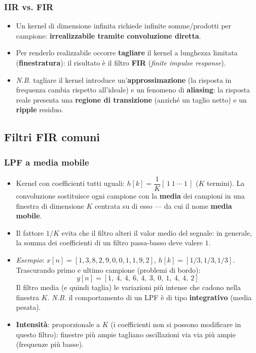 \documentclass[12pt, a4paper]{article}
\begin{document}
\subsubsection{IIR vs. FIR}
\begin{itemize}
    \item Un kernel di dimensione infinita richiede infinite somme/prodotti per campione: \textbf{irrealizzabile tramite convoluzione diretta}.
    \item Per renderlo realizzabile occorre \textbf{tagliare} il kernel a lunghezza limitata (\textbf{finestratura}): il risultato è il filtro \textbf{FIR} (\textit{finite impulse response}).
    \item[] \textit{N.B.} tagliare il kernel introduce un'\textbf{approssimazione} (la risposta in frequenza cambia rispetto all'ideale) e un fenomeno di \textbf{aliasing}: la risposta reale presenta una \textbf{regione di transizione} (anziché un taglio netto) e un \textbf{ripple} residuo.
\end{itemize}

\subsection{Filtri FIR comuni}

\subsubsection{LPF a media mobile}
\begin{itemize}
    \item Kernel con coefficienti tutti uguali: $h[k]=\dfrac1K[\,1\ 1\ \cdots\ 1\,]$ ($K$ termini). La convoluzione sostituisce ogni campione con la \textbf{media} dei campioni in una finestra di dimensione $K$ centrata su di esso — da cui il nome \textbf{media mobile}.
    \item Il fattore $1/K$ evita che il filtro alteri il valor medio del segnale: in generale, la somma dei coefficienti di un filtro passa-basso deve valere $1$.
    \item \textit{Esempio}: $x[n]=[1,3,8,2,9,0,0,1,1,9,2]$, $h[k]=[1/3,1/3,1/3]$. Trascurando primo e ultimo campione (problemi di bordo):
    $$y[n] = [1,\ 4,\ 4,\ 6,\ 4,\ 3,\ 0,\ 1,\ 4,\ 4,\ 2]$$
    Il filtro media (e quindi taglia) le variazioni più intense che cadono nella finestra $K$. \textit{N.B.} il comportamento di un LPF è di tipo \textbf{integrativo} (media pesata).
    \item \textbf{Intensità}: proporzionale a $K$ (i coefficienti non si possono modificare in questo filtro): finestre più ampie tagliano oscillazioni via via più ampie (frequenze più basse).
\end{itemize}
\end{document}
